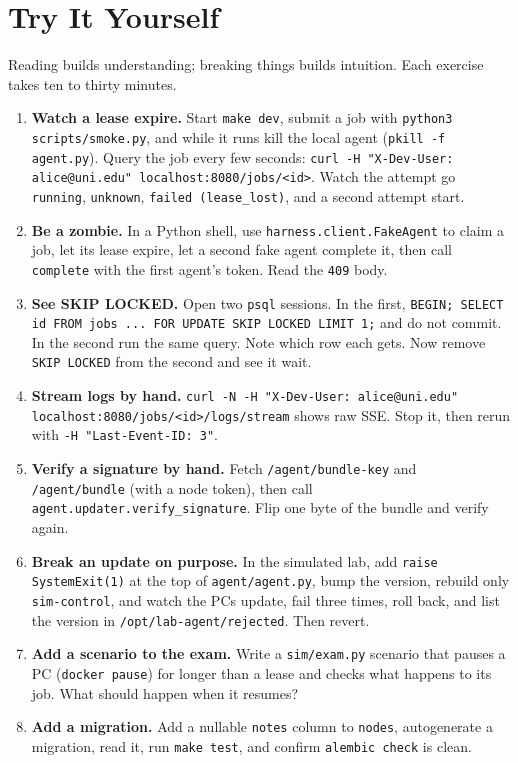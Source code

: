 \section{Try It Yourself}

Reading builds understanding; breaking things builds intuition. Each exercise
takes ten to thirty minutes.

\begin{enumerate}
\item \textbf{Watch a lease expire.} Start \texttt{make dev}, submit a job with
  \texttt{python3 scripts/smoke.py}, and while it runs kill the local agent
  (\texttt{pkill -f agent.py}). Query the job every few seconds:
  \texttt{curl -H "X-Dev-User: alice@uni.edu" localhost:8080/jobs/<id>}. Watch
  the attempt go \texttt{running}, \texttt{unknown}, \texttt{failed
  (lease\_lost)}, and a second attempt start.

\item \textbf{Be a zombie.} In a Python shell, use \texttt{harness.client.FakeAgent}
  to claim a job, let its lease expire, let a second fake agent complete it,
  then call \texttt{complete} with the first agent's token. Read the
  \texttt{409} body.

\item \textbf{See SKIP LOCKED.} Open two \texttt{psql} sessions. In the first,
  \texttt{BEGIN; SELECT id FROM jobs ... FOR UPDATE SKIP LOCKED LIMIT 1;} and
  do not commit. In the second run the same query. Note which row each gets.
  Now remove \texttt{SKIP LOCKED} from the second and see it wait.

\item \textbf{Stream logs by hand.}
  \texttt{curl -N -H "X-Dev-User: alice@uni.edu"
  localhost:8080/jobs/<id>/logs/stream} shows raw SSE. Stop it, then rerun with
  \texttt{-H "Last-Event-ID: 3"}.

\item \textbf{Verify a signature by hand.} Fetch
  \texttt{/agent/bundle-key} and \texttt{/agent/bundle} (with a node token),
  then call \texttt{agent.updater.verify\_signature}. Flip one byte of the bundle
  and verify again.

\item \textbf{Break an update on purpose.} In the simulated lab, add
  \texttt{raise SystemExit(1)} at the top of \texttt{agent/agent.py}, bump the
  version, rebuild only \texttt{sim-control}, and watch the PCs update, fail
  three times, roll back, and list the version in
  \texttt{/opt/lab-agent/rejected}. Then revert.

\item \textbf{Add a scenario to the exam.} Write a \texttt{sim/exam.py}
  scenario that pauses a PC (\texttt{docker pause}) for longer than a lease and
  checks what happens to its job. What should happen when it resumes?

\item \textbf{Add a migration.} Add a nullable \texttt{notes} column to
  \texttt{nodes}, autogenerate a migration, read it, run \texttt{make test}, and
  confirm \texttt{alembic check} is clean.
\end{enumerate}

